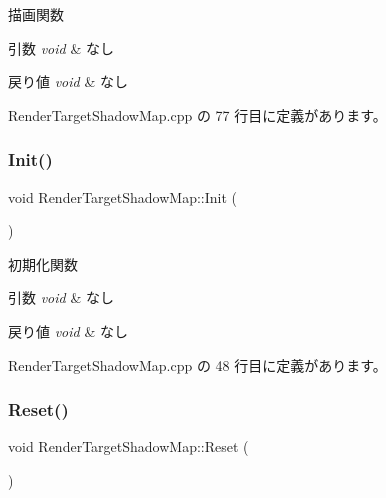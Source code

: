 描画関数 


\begin{DoxyParams}{引数}
{\em void} & なし \\
\hline
\end{DoxyParams}

\begin{DoxyRetVals}{戻り値}
{\em void} & なし \\
\hline
\end{DoxyRetVals}


 Render\+Target\+Shadow\+Map.\+cpp の 77 行目に定義があります。

\mbox{\label{class_render_target_shadow_map_a4ef385cc7898df1912bb158b21a97fc2}} 
\subsubsection{\texorpdfstring{Init()}{Init()}}
{\footnotesize\ttfamily void Render\+Target\+Shadow\+Map\+::\+Init (\begin{DoxyParamCaption}{ }\end{DoxyParamCaption})}



初期化関数 


\begin{DoxyParams}{引数}
{\em void} & なし \\
\hline
\end{DoxyParams}

\begin{DoxyRetVals}{戻り値}
{\em void} & なし \\
\hline
\end{DoxyRetVals}


 Render\+Target\+Shadow\+Map.\+cpp の 48 行目に定義があります。

\mbox{\label{class_render_target_shadow_map_a6bc527acde727f9005f056fc36f941be}} 
\subsubsection{\texorpdfstring{Reset()}{Reset()}}
{\footnotesize\ttfamily void Render\+Target\+Shadow\+Map\+::\+Reset (\begin{DoxyParamCaption}{ }\end{DoxyParamCaption})}



